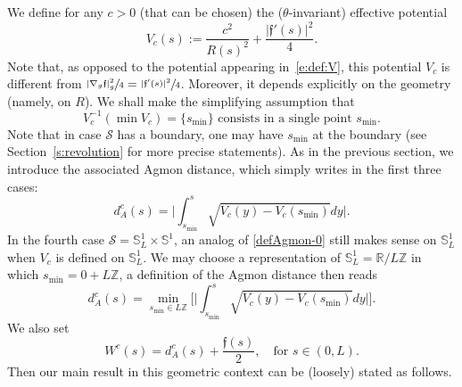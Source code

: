 \documentclass[10pt]{amsart}
\theoremstyle{definition}
\newcommand{\calS}{\ensuremath{\mathcal S}}
\newcommand{\mb}[1]{\ensuremath{\mathbb{#1}}}
\newcommand{\R}{{\mb{R}}}
\newcommand{\bS}{\ensuremath{\mathbb S}}
\newcommand{\Z}{\mathbb Z}
\newcommand{\f}{\ensuremath{\mathfrak{f}}}
\newcommand{\ce}{c}
\begin{document}
We define for any $\ce>0$ (that can be chosen) the ($\theta$-invariant) effective potential
\begin{equation}
\label{e:def-Vce}
V_\ce (s) := \frac{\ce^2}{R(s)^2} + \frac{| \f'(s)|^2}{4}.
\end{equation}
Note that, as opposed to the potential appearing in~\eqref{e:def:V}, this potential $V_\ce$ is different from $\sfrac{|\nabla_g\f|_g^2}{4} = \sfrac{| \f'(s)|^2}{4}$.
Moreover, it depends explicitly on the geometry (namely, on $R$).
We shall make the simplifying assumption that
\begin{equation}
\label{s:asspt-uniq-min}
V_{\ce}^{-1}(\min V_\ce) = \{s_{\min}\} \text{ consists in a single point }s_{\min}.
\end{equation}
Note that in case $\calS$ has a boundary, one may have $s_{\min}$ at the boundary (see Section~\ref{s:revolution} for more precise statements).
As in the previous section, we introduce the associated Agmon distance, which simply writes in the first three cases:
\begin{equation}
\label{e:defbisdA}
d_{A}^{\ce}(s) = \biggl| \int_{s_{\min}}^s \sqrt{ V_\ce(y)- V_\ce(s_{\min})} dy \biggr|.
\end{equation}
In the fourth case $\calS = \bS^1_L\times \bS^1$, an analog of \eqref{defAgmon-0} still makes sense on $\bS^1_L$ when $V_{\ce}$ is defined on $\bS^1_L$. We may choose a representation of $\bS^1_L=\R/L\Z$ in which $s_{\min}= 0 + L \Z$, a definition of the Agmon distance then reads
\begin{equation}
\label{e:defbisdAT2}
d_{A}^{\ce}(s) = \min_{s_{\min}\in L \Z}\biggl[ \biggl| \int_{s_{\min}}^s \sqrt{ V_\ce(y)- V_\ce(s_{\min})} dy \biggr|\biggr].
\end{equation}
We also set
\begin{equation}
\label{e:def-Wce}
W^{\ce}(s)=d_A^{\ce}(s)+\frac{\f(s)}{2},\quad \text{for } s \in (0,L).
\end{equation}
Then our main result in this geometric context can be (loosely) stated as follows.
\end{document}
